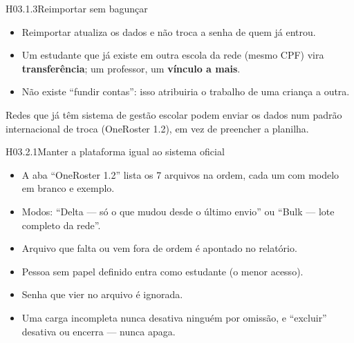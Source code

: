 \begin{historia}{H03.1.3}{Reimportar sem bagunçar}{\pronto}
\aceite
\begin{itemize}
  \item Reimportar atualiza os dados e não troca a senha de quem já entrou.
  \item Um estudante que já existe em outra escola da rede (mesmo CPF) vira
    \textbf{transferência}; um professor, um \textbf{vínculo a mais}.
  \item Não existe \enquote{fundir contas}: isso atribuiria o trabalho de uma
    criança a outra.
\end{itemize}
\end{historia}


Redes que já têm sistema de gestão escolar podem enviar os dados num padrão
internacional de troca (OneRoster 1.2), em vez de preencher a planilha.

\begin{historia}{H03.2.1}{Manter a plataforma igual ao sistema oficial}{\pronto}
\aceite
\begin{itemize}
  \item A aba \enquote{OneRoster 1.2} lista os 7 arquivos na ordem, cada um com
    modelo em branco e exemplo.
  \item Modos: \enquote{Delta --- só o que mudou desde o último envio} ou
    \enquote{Bulk --- lote completo da rede}.
  \item Arquivo que falta ou vem fora de ordem é apontado no relatório.
  \item Pessoa sem papel definido entra como estudante (o menor acesso).
  \item Senha que vier no arquivo é ignorada.
  \item Uma carga incompleta nunca desativa ninguém por omissão, e
    \enquote{excluir} desativa ou encerra --- nunca apaga.
\end{itemize}
\end{historia}



